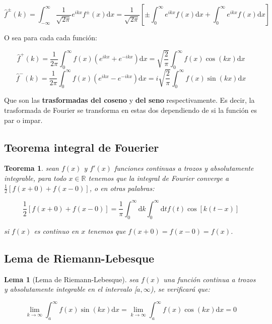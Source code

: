 \documentclass[12pt,a4paper]{book}
\newcommand{\ccorchetes}[1]{\left[ #1  \right]}
\newcommand{\D}{\mathrm{d}}
\newcommand{\inti}{\int_{-\infty}^{\infty}}
\newcommand{\into}{\int_{0}^{\infty}}
\newcommand{\hatf}{\widehat{f}}
\newtheorem{theorem}{Teorema}[section]
\newtheorem{lemma}{Lema}[section]
\begin{document}
\begin{equation}
\hatf^{\pm} (k) = \inti \dfrac{1}{\sqrt{2 \pi}} e^{ikx} f^{\pm} (x) \D x = \dfrac{1}{\sqrt{2 \pi}} \ccorchetes{\pm \int_{0}^\infty e^{ikx} f(x) \D x + \int_{0}^\infty e^{ikx} f (x) \D x }
 \end{equation}
 
O sea para cada cada función:
 
\begin{equation}
\hatf^{+} (k) = \dfrac{1}{2 \pi} \int_0^\infty f(x) (e^{ikx} + e^{-ikx} ) \D x = \sqrt{ \dfrac{2}{\pi} } \int_0^\infty f(x) \cos(kx) \D x
\end{equation}
\begin{equation}
\hatf^{-} (k) = \dfrac{1}{2 \pi} \int_0^\infty f(x) (e^{ikx} - e^{-ikx} ) \D x = i \sqrt{ \dfrac{2}{\pi} }  \int_0^\infty f(x) \sin(kx) \D x
\end{equation}

Que son las \textbf{trasformadas del coseno} y \textbf{del seno} respectivamente. Es decir, la trasformada de Fourier se transforma en estas dos dependiendo de si la función es par o impar.\\


\subsection{Teorema integral de Fouerier}

\begin{theorem}
sean $f(x)$ y $f'(x)$ funciones continuas a trozos y absolutamente integrable, para todo $x \in  \mathbb{R}$ tenemos que la integral de Fourier converge a $\frac{1}{2} \left[ f(x+0) + f(x-0) \right]$, o en otras palabras:

$$  \dfrac{1}{2} \left[ f(x+0) + f(x-0) \right] = \dfrac{1}{\pi} \into \D k \into \D t f(t) \cos [k(t-x)]   $$

si $f(x)$ es continuo en $x$ tenemos que $f(x+0) = f(x-0) = f(x)$. 

\end{theorem}

\subsection{Lema de Riemann-Lebesque}

\begin{lemma}[Lema de Riemann-Lebesque]
sea $f(x)$ una función continua a trozos y absolutamente integrable en el intervalo [$a, \infty$), se verificará que:

$$ \lim_{k \rightarrow \infty} \int_a^\infty f(x)  \sin (k x) \D x  = \lim_{k \rightarrow \infty} \int_a^\infty f(x)  \cos (k x) \D x = 0$$
\end{lemma}
\end{document}
